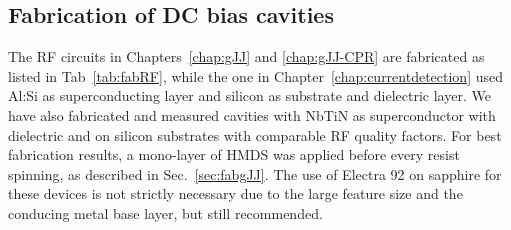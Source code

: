 \subsection{Fabrication of DC bias cavities}\label{sec:fabRF}

The RF circuits in Chapters~\ref{chap:gJJ} and \ref{chap:gJJ-CPR} are fabricated as listed in Tab~\ref{tab:fabRF}, while the one in Chapter~\ref{chap:currentdetection} used Al:Si as superconducting layer and silicon as substrate and dielectric layer.
%
We have also fabricated and measured cavities with NbTiN as superconductor with  dielectric and on silicon substrates with comparable RF quality factors.
%
For best fabrication results, a mono-layer of HMDS was applied before every resist spinning, as described in Sec.~\ref{sec:fabgJJ}.
%
The use of Electra 92 on sapphire for these devices is not strictly necessary due to the large feature size and the conducing metal base layer, but still recommended.

